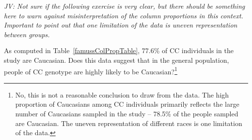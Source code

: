\begin{doublespace}
\textit{JV: Not sure if the following exercise is very clear, but there should be something here to warn against misinterpretation of the column proportions in this context. Important to point out that one limitation of the data is uneven representation between groups.}

\begin{exercise}
As computed in Table~\ref{famussColPropTable}, 77.6\% of CC individuals in the study are Caucasian. Does this data suggest that in the general population, people of CC genotype are highly likely to be Caucasian?\footnote{No, this is not a reasonable conclusion to draw from the data. The high proportion of Caucasians among CC individuals primarily reflects the large number of Caucasians sampled in the study -- 78.5\% of the people sampled are Caucasian. The uneven representation of different races is one limitation of the  data.}
\end{exercise}

\end{doublespace}
